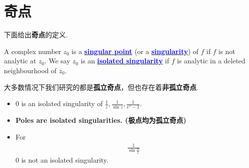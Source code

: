 \section{奇点}
	下面给出\textbf{奇点}的定义.
	\begin{defn}\label{def 8.2.1}
		A complex number $z_0$ is a \underline{\textcolor{blue}{\textbf{singular point}}} (or a \underline{\textcolor{blue}{\textbf{singularity}}}) of $f$ if $f$ is not analytic at $z_0$. We say $z_0$ is an \underline{\textcolor{blue}{\textbf{isolated singularity}}} if $f$ is analytic in a deleted neighbourhood of $z_0$.
		
		\vspace{1em}
		\begin{rmk}
			大多数情况下我们研究的都是\textbf{孤立奇点}，但也存在着\textbf{非孤立奇点}.
			\begin{example}\label{ex 8.2.1}
				\begin{itemize}
					\item $0$ is an isolated singularity of $\frac{1}{z} , \frac{1}{\sin{z}} , \frac{1}{e^z - 1}$.
					
					\item \textbf{Poles are isolated singularities. (极点均为孤立奇点)}
					
					\item For 
					\begin{align}
						\frac{1}{\sin{\frac{\pi}{z}}}
					\end{align}
					$0$ is not an isolated singularity.
				\end{itemize}
			\end{example}
		\end{rmk}
	\end{defn}

\vspace{2em}
